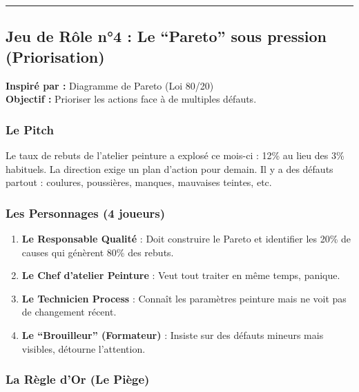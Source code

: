 \documentclass[
]{article}
\providecommand{\tightlist}{%
  \setlength{\itemsep}{0pt}\setlength{\parskip}{0pt}}
\begin{document}
\begin{center}\rule{0.5\linewidth}{0.5pt}\end{center}

\subsection{Jeu de Rôle n°4 : Le ``Pareto'' sous pression
(Priorisation)}\label{jeu-de-ruxf4le-n4-le-pareto-sous-pression-priorisation}

\textbf{Inspiré par :} Diagramme de Pareto (Loi 80/20)\\
\textbf{Objectif :} Prioriser les actions face à de multiples défauts.

\subsubsection{Le Pitch}\label{le-pitch-3}

Le taux de rebuts de l'atelier peinture a explosé ce mois-ci : 12\% au
lieu des 3\% habituels. La direction exige un plan d'action pour demain.
Il y a des défauts partout : coulures, poussières, manques, mauvaises
teintes, etc.

\subsubsection{Les Personnages (4
joueurs)}\label{les-personnages-4-joueurs-2}

\begin{enumerate}
\def\labelenumi{\arabic{enumi}.}
\tightlist
\item
  \textbf{Le Responsable Qualité} : Doit construire le Pareto et
  identifier les 20\% de causes qui génèrent 80\% des rebuts.
\item
  \textbf{Le Chef d'atelier Peinture} : Veut tout traiter en même temps,
  panique.
\item
  \textbf{Le Technicien Process} : Connaît les paramètres peinture mais
  ne voit pas de changement récent.
\item
  \textbf{Le ``Brouilleur'' (Formateur)} : Insiste sur des défauts
  mineurs mais visibles, détourne l'attention.
\end{enumerate}

\subsubsection{La Règle d'Or (Le
Piège)}\label{la-ruxe8gle-dor-le-piuxe8ge-3}
\end{document}
